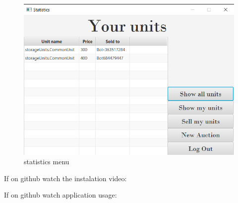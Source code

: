 \documentclass[
]{report}
\begin{document}
\begin{figure}
\centering
\includegraphics{images/statistics.png}
\caption{statistics menu}
\end{figure}

If on github watch the instalation video:

If on github watch application usage:

  
\end{document}
